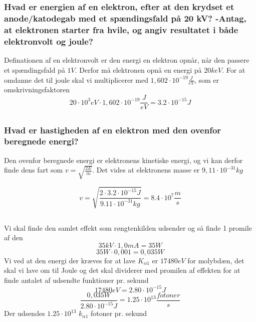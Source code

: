 \documentclass[a4paper,twoside]{article}
\begin{document}
\subsection{}
\subsubsection*{Hvad er energien af en elektron, efter at den krydset et anode/katodegab med et spændingsfald på 20 kV? -Antag, at elektronen starter fra hvile, og angiv resultatet i
både elektronvolt og joule?}
Definationen af en elektronvolt er den energi en elektron opnår, når den passere et spændingsfald på $1V$. Derfor må elektronen opnå en energi på $20keV$. For at omdanne det til joule skal vi multiplicerer med $1,602\cdot10^{-19} \frac{J}{eV}$, som er omskrivningsfaktoren
\begin{equation*}
20\cdot10^3 eV \cdot1,602\cdot10^{-19} \frac{J}{eV}=3.2\cdot10^{-15} J
\end {equation*}

\subsection{}
\subsubsection*{Hvad er hastigheden af en elektron med den ovenfor beregnede energi?}
Den ovenfor beregnede energi er elektronens kinetiske energi, og vi kan derfor finde dens fart som $v=\sqrt{\frac{2E}{m}}$.
Det vides at elektronens masse er $9,11\cdot10^{-31} kg$

\begin {equation*}
v=\sqrt{\frac{2\cdot3.2\cdot10^{-15}J}{9.11\cdot10^{-31}kg}}=8.4\cdot10^7 \frac{m}{s}
\end{equation*}
\subsection{}
Vi skal finde den samlet effekt som røngtenkilden udsender og så finde 1 promile af den 
\begin{equation*}
35kV\cdot1,0mA=35W
\end{equation*}
\begin{equation*}
    35W\cdot0,001=0,035W
\end{equation*}
Vi ved at den energi der kræves for at lave $K_{\alpha1}$ er $17480eV$ for molybdæn, det skal vi lave om til Joule og det skal dividerer med promilen af effekten for at finde antalet af udsendte funktioner pr. sekund
\begin{equation}
    17480eV=2.80\cdot10^{-15}J
\end{equation}
\begin{equation*}
     \frac{0,035W}{2.80\cdot10^{-15}J}=1.25\cdot10^{13}\frac{fotoner}{s} 
\end{equation*}
Der udsendes $1.25\cdot10^{13}$ $k_{\alpha1}$ fotoner pr. sekund
\end{document}
